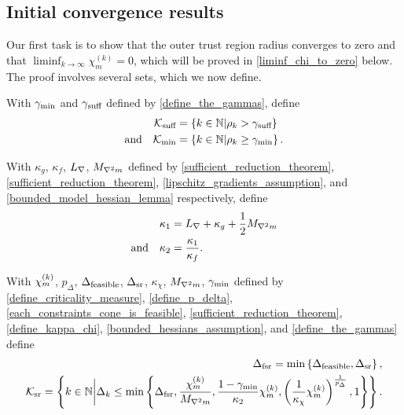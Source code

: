 \subsection{Initial convergence results}

\label{initial_convergence_results}

Our first task is to show that the outer trust region radius converges to zero and that $\liminf_{k \rightarrow\infty} \chi_m^{(k)} =0$, which will be proved in \cref{liminf_chi_to_zero} below.    The proof involves several sets, which we now define.  

With
$\gamma_{\textrm{min}}$ and $\gamma_{\textrm{suff}}$
defined by \cref{define_the_gammas},
define
\begin{align}
{\mathcal K_{\textrm{suff}}} &= \left\{k \in \mathbb N | \rho_k > \gamma_{\textrm{suff}} \right\} \label{define_suffiterates} \\
\textrm{and} \quad {\mathcal K_{\textrm{min}}} &= \left\{k \in \mathbb N | \rho_k \ge \gamma_{\textrm{min}} \right\} \label{define_miniterates}.
\end{align}

With
$\kappa_g$, $\kappa_f$, ${L_{\nabla}}$, ${M_{\nabla^2 m}}$
defined by
\cref{sufficient_reduction_theorem}, \cref{sufficient_reduction_theorem}, \cref{lipschitz_gradients_assumption}, and \cref{bounded_model_hessian_lemma}
respectively,  define
\begin{align}
{\kappa_1} &= {L_{\nabla}} + \kappa_{g} + \frac 1 2 {M_{\nabla^2 m}} \label{define_theircnot} \\
\textrm{and} \quad {\kappa_2} &= \frac{{\kappa_1}}{\kappa_f} .  \label{define_theirc}
\end{align}

With
${\chi_m^{(k)}}$, $p_{\Delta}$, ${\Delta_{\textrm{feasible}}}$, ${\Delta_{\textrm{sr}}}$, $\kappa_{\chi}$, ${M_{\nabla^2 m}}$, $\gamma_{\textrm{min}}$
defined by 
\cref{define_criticality_measure}, \cref{define_p_delta}, 
\cref{each_constraints_cone_is_feasible},
\cref{sufficient_reduction_theorem}, \cref{define_kappa_chi}, \cref{bounded_hessians_assumption}, and \cref{define_the_gammas}
define
\begin{align}
\Delta_{\textrm{fsr}} = \min\left\{{\Delta_{\textrm{feasible}}}, {\Delta_{\textrm{sr}}}\right\}, \label{define_dgood} \\
{\mathcal K_{\textrm{sr}}} = \left \{ k \in \mathbb N \bigg| \Delta_k \le \min \left\{ 
\Delta_{\textrm{fsr}},
\frac {{\chi_m^{(k)}}}{{M_{\nabla^2 m}}}, 
\frac{1-\gamma_{\textrm{min}}}{{\kappa_2}}{\chi_m^{(k)}},
\left(\frac 1 {\kappa_{\chi}}  {\chi_m^{(k)}}\right)^{\frac 1 {p_{\Delta}}}, 
1
\right\} \right \}. \label{define_reduceiterates}
\end{align}

